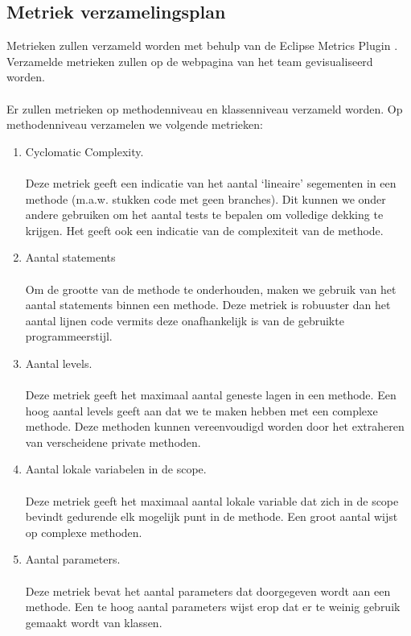 \subsection{Metriek verzamelingsplan}
Metrieken zullen verzameld worden met behulp van de Eclipse Metrics Plugin \cite{EclipseMetricsPlugin}. Verzamelde metrieken zullen op de webpagina van het team gevisualiseerd worden.
\\
\\
Er zullen metrieken op methodenniveau en klassenniveau verzameld worden. Op methodenniveau verzamelen we volgende metrieken:
\begin{enumerate}
	\item 
		Cyclomatic Complexity.
		\\
		\\ %
		Deze metriek geeft een indicatie van het aantal `lineaire' segementen in een methode (m.a.w. stukken code met geen branches). Dit kunnen we onder andere gebruiken om het aantal tests te bepalen om volledige dekking te krijgen. Het geeft ook een indicatie van de complexiteit van de methode.
		
	\item 
		Aantal statements
		\\
		\\
		Om de grootte van de methode te onderhouden, maken we gebruik van het aantal statements binnen een methode. Deze metriek is robuuster dan het aantal lijnen code vermits deze onafhankelijk is van de gebruikte programmeerstijl.
	\item
		Aantal levels.
		\\
		\\
		Deze metriek geeft het maximaal aantal geneste lagen in een methode. Een hoog aantal levels geeft aan dat we te maken hebben met een complexe  methode. Deze methoden kunnen vereenvoudigd worden door het extraheren van verscheidene private methoden.
	
	\item
		Aantal lokale variabelen in de scope.
		\\
		\\
		Deze metriek geeft het maximaal aantal lokale variable dat zich in de scope bevindt gedurende elk mogelijk punt in de methode. Een groot aantal wijst op complexe methoden.
	\item
		Aantal parameters.
		\\
		\\
		Deze metriek bevat het aantal parameters dat doorgegeven wordt aan een methode. Een te hoog aantal parameters wijst erop dat er te weinig gebruik gemaakt wordt van klassen.
	

\end{enumerate}
